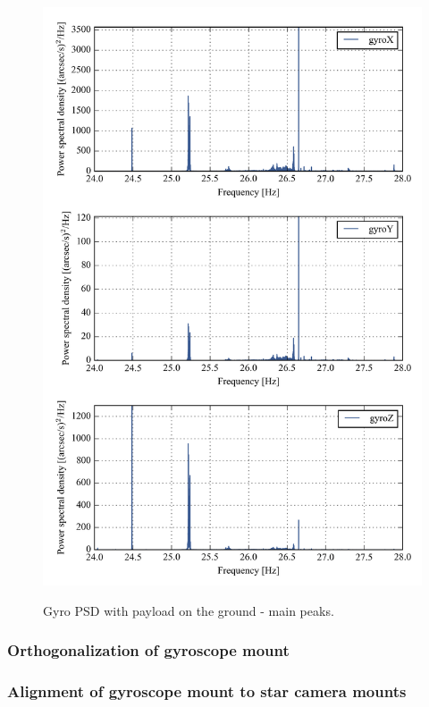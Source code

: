 \begin{figure}[!h]
\begin{center}
\includegraphics{Figures/multiPSD_no_loglog_zoom_400.png}
\label{fig:multiPSD400_no_loglog_zoom_400}
\caption[Gyro PSD with payload on the ground - Main peaks]{Gyro PSD with payload on the ground - main peaks.}
\end{center}
\end{figure}



\subsubsection{Orthogonalization of gyroscope mount}
\label{ap:gyroOrth}
\subsubsection{Alignment of gyroscope mount to star camera mounts}

